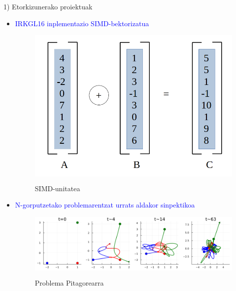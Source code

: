 \documentclass[
 10pt,%
 compress,%
 t,       %
 xcolor=svgnames
]{beamer}
\theoremstyle{definition} \newtheorem{definicion}{Definicion}[section]
\theoremstyle{propiedades} \newtheorem{propiedades}{Propiedades}[section]
\begin{document}
\begin{frame}[fragile]{1) Etorkizunerako proiektuak} 	
	
	
\medskip
\small

\begin{itemize}
	
	\item[1)] \textcolor{blue}{ IRKGL16 inplementazio SIMD-bektorizatua}
	

		\begin{figure}
			\centering
			\begin{minipage}{0.5\textwidth}
				\colorbox{white}  {\includegraphics[width=0.5\linewidth]{SIMD}}
						\centering \caption{\centering \tiny SIMD-unitatea}
			\end{minipage}
		\end{figure}
		
	
	
	\item[2)] 	\textcolor{blue}{N-gorputzetako problemarentzat urrats aldakor sinpektikoa}
	
	\bigskip
	
	\begin{figure}
		\centering
		\begin{minipage}{.9\textwidth}
			\colorbox{white}  {\includegraphics[width=0.9\linewidth]{PythagoreanP}}
			\centering \caption{\centering \tiny Problema Pitagorearra}
		\end{minipage}
	\end{figure}
\end{itemize}






\end{frame}
\end{document}
